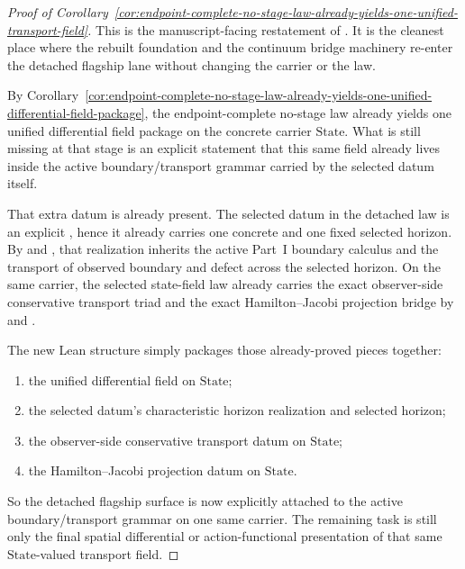 \begin{proof}[Proof of Corollary~\ref{cor:endpoint-complete-no-stage-law-already-yields-one-unified-transport-field}]
\label{proof:cor:endpoint-complete-no-stage-law-already-yields-one-unified-transport-field}
This is the manuscript-facing restatement of
.
It is the cleanest place where the rebuilt foundation and the continuum bridge
machinery re-enter the detached flagship lane without changing the carrier or
the law.

By Corollary~\ref{cor:endpoint-complete-no-stage-law-already-yields-one-unified-differential-field-package},
the endpoint-complete no-stage law already yields one unified differential
field package on the concrete carrier \(\mathrm{State}\). What is still
missing at that stage is an explicit statement that this same field already
lives inside the active boundary/transport grammar carried by the selected
datum itself.

That extra datum is already present. The selected datum in the detached law is
an explicit , hence it already carries one concrete
 and one fixed selected horizon. By
 and , that
realization inherits the active Part~I boundary calculus and the transport of
observed boundary and defect across the selected horizon. On the same carrier,
the selected state-field law already carries the exact observer-side
conservative transport triad and the exact Hamilton--Jacobi projection bridge
by  and
.

The new Lean structure  simply
packages those already-proved pieces together:
\begin{enumerate}[label=(\roman*), leftmargin=2em, itemsep=0.2em]
\item the unified differential field on \(\mathrm{State}\);
\item the selected datum's characteristic horizon realization and selected
      horizon;
\item the observer-side conservative transport datum on \(\mathrm{State}\);
\item the Hamilton--Jacobi projection datum on \(\mathrm{State}\).
\end{enumerate}
So the detached flagship surface is now explicitly attached to the active
boundary/transport grammar on one same carrier. The remaining task is still
only the final spatial differential or action-functional presentation of that
same \(\mathrm{State}\)-valued transport field.
\end{proof}

